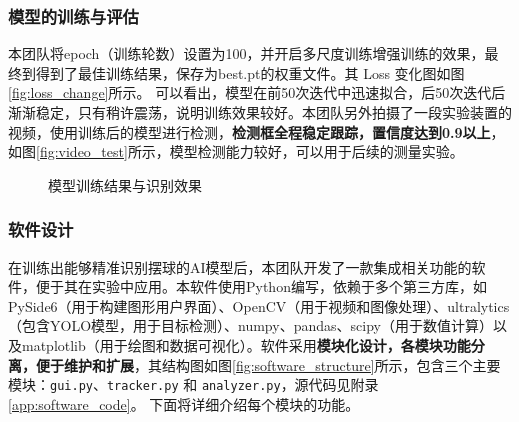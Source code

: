 \subsubsection{模型的训练与评估}
本团队将epoch（训练轮数）设置为100，并开启多尺度训练增强训练的效果，最终到得到了最佳训练结果，保存为best.pt的权重文件。其 Loss 变化图如图\ref{fig:loss_change}所示。
可以看出，模型在前50次迭代中迅速拟合，后50次迭代后渐渐稳定，只有稍许震荡，说明训练效果较好。本团队另外拍摄了一段实验装置的视频，使用训练后的模型进行检测，\textbf{检测框全程稳定跟踪，置信度达到0.9以上}，如图\ref{fig:video_test}所示，模型检测能力较好，可以用于后续的测量实验。
\begin{figure}[H]
    \centering
    \caption{模型训练结果与识别效果}
    \label{fig:test_result}
\end{figure}

\subsubsection{软件设计}

在训练出能够精准识别摆球的AI模型后，本团队开发了一款集成相关功能的软件，便于其在实验中应用。本软件使用Python编写，依赖于多个第三方库，如PySide6（用于构建图形用户界面）、OpenCV（用于视频和图像处理）、ultralytics（包含YOLO模型，用于目标检测）、numpy、pandas、scipy（用于数值计算）以及matplotlib（用于绘图和数据可视化）。软件采用\textbf{模块化设计，各模块功能分离，便于维护和扩展}，其结构图如图\ref{fig:software_structure}所示，包含三个主要模块：\texttt{gui.py}、\texttt{tracker.py} 和 \texttt{analyzer.py}，源代码见附录\ref{app:software_code}。
下面将详细介绍每个模块的功能。

